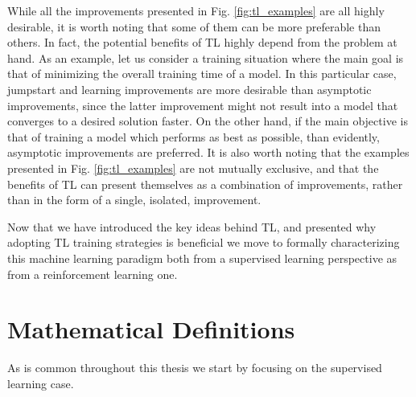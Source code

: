 While all the improvements presented in Fig. \ref{fig:tl_examples} are all highly desirable, it is  worth noting that some of them can be more preferable than others. In fact, the potential benefits of TL highly depend from the problem at hand. As an example, let us consider a training situation where the main goal is that of minimizing the overall training time of a model. In this particular case, jumpstart and learning improvements are more desirable than asymptotic improvements, since the latter improvement might not result into a model that converges to a desired solution faster. On the other hand, if the main objective is that of training a model which performs as best as possible, than evidently, asymptotic improvements are preferred. It is also worth noting that the examples presented in Fig. \ref{fig:tl_examples} are not mutually exclusive, and that the benefits of TL can present themselves as a combination of improvements, rather than in the form of a single, isolated, improvement. 

Now that we have introduced the key ideas behind TL, and presented why adopting TL training strategies is beneficial we move to formally characterizing this machine learning paradigm both from a supervised learning perspective as from a reinforcement learning one.  


\section{Mathematical Definitions}
\label{sec:definitions}

As is common throughout this thesis we start by focusing on the supervised learning case.

